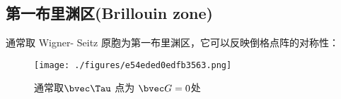 \subsection{第一布里渊区(Brillouin zone)}
通常取 Wigner- Seitz 原胞为第一布里渊区，它可以反映倒格点阵的对称性：
\begin{figure}[ht]
\centering
\texttt{[image: ./figures/e54eded0edfb3563.png]}
\caption{通常取$\bvec \Tau$ 点为 $\bvec G = 0$处} \label{fig_BriZon_1}
\end{figure}
